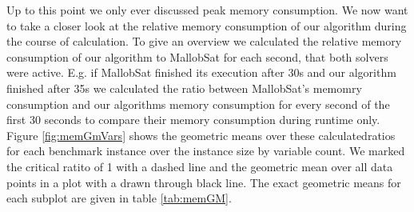\documentclass[12pt,a4paper,twoside]{scrartcl}
\numberwithin{equation}{section}
\begin{document}
\label{sec:GMs}
Up to this point we only ever discussed peak memory consumption. We now want to take a closer look at the relative memory consumption of our algorithm during the course of calculation. To give an overview we calculated the relative memory consumption of our algorithm to MallobSat for each second, that both solvers were active. E.g. if MallobSat finished its execution after 30s and our algorithm finished after 35s we calculated the ratio between MallobSat's memomry consumption and our algorithms memory consumption for every second of the first 30 seconds to compare their memory consumption during runtime only. Figure \ref{fig:memGmVars} shows the geometric means over these calculatedratios for each benchmark instance over the instance size by variable count. We marked the critical ratito of 1 with a dashed line and the geometric mean over all data points in a plot with a drawn through black line. The exact geometric means for each subplot are given in table \ref{tab:memGM}.
\end{document}
